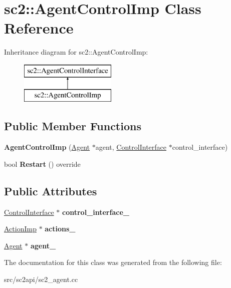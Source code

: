 \hypertarget{classsc2_1_1_agent_control_imp}{}\section{sc2\+:\+:Agent\+Control\+Imp Class Reference}
\label{classsc2_1_1_agent_control_imp}
Inheritance diagram for sc2\+:\+:Agent\+Control\+Imp\+:\begin{figure}[H]
\begin{center}
\leavevmode
\includegraphics[height=2.000000cm]{classsc2_1_1_agent_control_imp}
\end{center}
\end{figure}
\subsection*{Public Member Functions}
\begin{DoxyCompactItemize}
\item 
\mbox{\label{classsc2_1_1_agent_control_imp_ad9d95c5c9672c812acfa881c0443550a}} 
{\bfseries Agent\+Control\+Imp} (\hyperlink{classsc2_1_1_agent}{Agent} $\ast$agent, \hyperlink{classsc2_1_1_control_interface}{Control\+Interface} $\ast$control\+\_\+interface)
\item 
\mbox{\label{classsc2_1_1_agent_control_imp_a8c7633f2d705e9bd64757f8bb8d36bf7}} 
bool {\bfseries Restart} () override
\end{DoxyCompactItemize}
\subsection*{Public Attributes}
\begin{DoxyCompactItemize}
\item 
\mbox{\label{classsc2_1_1_agent_control_imp_aa44e095f9943c6605dead2301663815b}} 
\hyperlink{classsc2_1_1_control_interface}{Control\+Interface} $\ast$ {\bfseries control\+\_\+interface\+\_\+}
\item 
\mbox{\label{classsc2_1_1_agent_control_imp_a22271ccc1432afcc5d009fc71acf337e}} 
\hyperlink{classsc2_1_1_action_imp}{Action\+Imp} $\ast$ {\bfseries actions\+\_\+}
\item 
\mbox{\label{classsc2_1_1_agent_control_imp_ae078e7bc6aacd9f970c852f9bd39bfbd}} 
\hyperlink{classsc2_1_1_agent}{Agent} $\ast$ {\bfseries agent\+\_\+}
\end{DoxyCompactItemize}


The documentation for this class was generated from the following file\+:\begin{DoxyCompactItemize}
\item 
src/sc2api/sc2\+\_\+agent.\+cc\end{DoxyCompactItemize}
